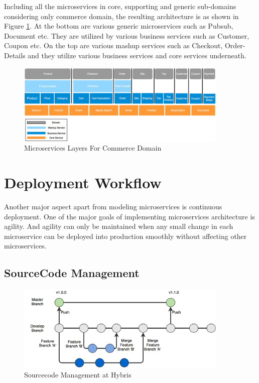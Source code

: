 Including all the microservices in core, supporting and generic sub-domains considering only commerce domain, the resulting architecture is as shown in Figure \ref{fig:hybris_architecture/interview/microservices_layers_commerce_domain}. At the bottom are various generic microservices such as Pubsub, Document etc. They are utilized by various business services such as Customer, Coupon etc. On the top are various mashup services such as Checkout, Order-Details and they utilize various business services and core services underneath.
\begin{figure}[H]
\begin{center}
\includegraphics[width=0.9\textwidth]{figures/hybris_architecture_six}
\caption{Microservices Layers For Commerce Domain}
\label{fig:hybris_architecture/interview/microservices_layers_commerce_domain}
\end{center}
\end{figure}

\section{Deployment Workflow}\label{section:hybris_architecture/deployment_workflow}
Another major aspect apart from modeling microservices is continuous deployment. One of the major goals of implementing microservices architecture is agility. And agility can only be maintained when any small change in each microservice can be deployed into production smoothly without affecting other microservices.\\

\subsection{SourceCode Management}\label{section:hybris_architecture/deployment_workflow/sourcecode_management}
\begin{figure}[H]
\begin{center}
\includegraphics[width=0.9\textwidth]{figures/hybris_architecture_sourcecode_magement}
\caption{Sourcecode Management at Hybris}
\label{fig:hybris_architecture/interview/sourcecode_management_at_hybris}
\end{center}
\end{figure}

